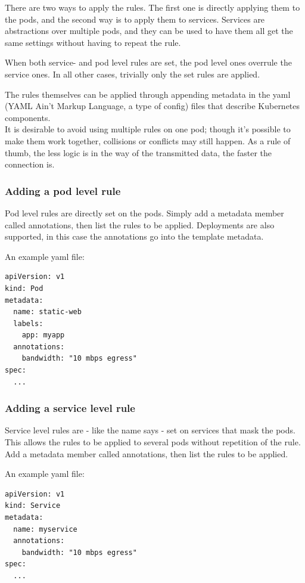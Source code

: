 There are two ways to apply the rules. The first one is directly applying them to the pods, and the second way is to apply them to services. Services are abstractions over multiple pods, and they can be used to have them all get the same settings without having to repeat the rule.

When both service- and pod level rules are set, the pod level ones overrule the service ones. In all other cases, trivially only the set rules are applied.

The rules themselves can be applied through appending metadata in the yaml (YAML Ain't Markup Language, a type of config) files that describe Kubernetes components. \\

It is desirable to avoid using multiple rules on one pod; though it's possible to make them work together, collisions or conflicts may still happen. As a rule of thumb, the less logic is in the way of the transmitted data, the faster the connection is. 

\newpage
\subsubsection{Adding a pod level rule}
Pod level rules are directly set on the pods. Simply add a metadata member called annotations, then list the rules to be applied. Deployments are also supported, in this case the annotations go into the template metadata.

\noindent
An example yaml file:

\begin{verbatim}
apiVersion: v1
kind: Pod
metadata:
  name: static-web
  labels:
    app: myapp
  annotations:
    bandwidth: "10 mbps egress"
spec:
  ...
\end{verbatim}

\subsubsection{Adding a service level rule}
Service level rules are - like the name says - set on services that mask the pods. This allows the rules to be applied to several pods without repetition of the rule. Add a metadata member called annotations, then list the rules to be applied.

\noindent
An example yaml file:

\begin{verbatim}
apiVersion: v1
kind: Service
metadata:
  name: myservice
  annotations:
    bandwidth: "10 mbps egress"
spec:
  ...
\end{verbatim}

